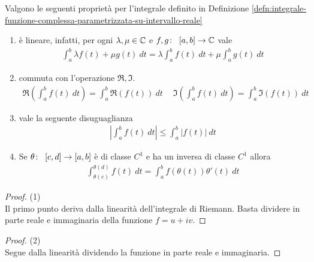 \begin{proposition}
	\label{prop:proprieta-funzione-complessa-parametrizzata-su-intervallo-reale}
	Valgono le seguenti proprietà per l'integrale definito in Definizione \ref{defn:integrale-funzione-complessa-parametrizzata-su-intervallo-reale}
	\begin{enumerate}
		\item è lineare, infatti, per ogni $\lambda, \mu \in \mathbb{C}$ e $f,g \colon\ \left[a,b\right] \rightarrow \mathbb{C}$ vale
		\begin{equation*}
		\begin{aligned}
		\int_{a}^{b} \lambda f(t)  + \mu g(t)\ dt = \lambda \int_{a}^{b} f(t)\ dt + \mu \int_{a}^{b} g(t)\ dt   
		\end{aligned}
		\end{equation*}
		\item commuta con l'operazione $\Re, \Im$.
		\begin{equation*}
		\begin{aligned}	
		\Re\left(\int_{a}^{b} f(t)\ dt\right) = \int_{a}^{b} \Re(f(t))\ dt \quad\ \Im\left(\int_{a}^{b} f(t)\ dt\right) = \int_{a}^{b} \Im(f(t))\ dt
		\end{aligned}
		\end{equation*} 
		\item vale la seguente disuguaglianza
		\begin{equation*}
		\begin{aligned}
		\left|\int_{a}^{b} f(t)\ dt\right| \le \int_{a}^{b} |f(t)|\ dt
		\end{aligned}
		\end{equation*}
		\item Se $\theta \colon\ \left[c,d\right] \rightarrow \left[a,b\right]$ è di classe $C^1$ e ha un inversa di classe $C^1$ allora
		\begin{equation*}
		\begin{aligned}
		\int_{\theta(c)}^{\theta(d)} f(t)\ dt = \int_{a}^{b} f(\theta(t))\theta'(t)\ dt
		\end{aligned}
		\end{equation*}
	\end{enumerate} 
\end{proposition}
\begin{proof} (1)\\
	Il primo punto deriva dalla linearità dell'integrale di Riemann. 
	Basta dividere in parte reale e immaginaria della funzione $f = u+ iv$.
\end{proof}

\begin{proof} (2)\\
	Segue dalla linearità dividendo la funzione in parte reale e immaginaria.	
\end{proof}

